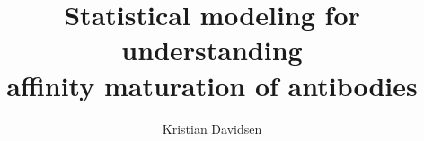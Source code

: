 %
%
%
%
%
%
%
%
%
%
%

\title{Statistical modeling for understanding \\affinity maturation of antibodies}

\author{Kristian Davidsen}




